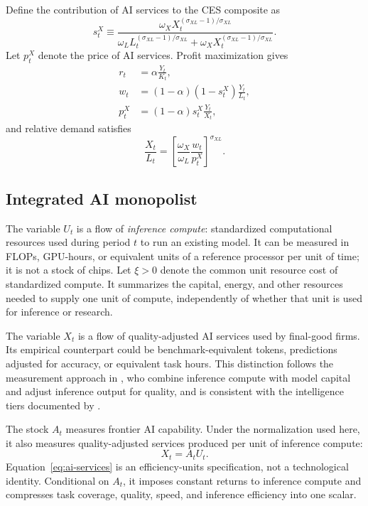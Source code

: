 Define the contribution of AI services to the CES composite as
\begin{equation}
    s^X_t
    \equiv
    \frac{\omega_X X_t^{(\sigma_{XL}-1)/\sigma_{XL}}}
    {\omega_L L_t^{(\sigma_{XL}-1)/\sigma_{XL}}
        +\omega_X X_t^{(\sigma_{XL}-1)/\sigma_{XL}}}.
    \label{eq:ai-composite-share}
\end{equation}
Let $p^X_t$ denote the price of AI services. Profit maximization gives
\begin{align}
    r_t
    &=\alpha\frac{Y_t}{K_t},
    \label{eq:capital-demand}\\
    w_t
    &=(1-\alpha)(1-s^X_t)\frac{Y_t}{L_t},
    \label{eq:labor-demand}\\
    p^X_t
    &=(1-\alpha)s^X_t\frac{Y_t}{X_t},
    \label{eq:ai-demand}
\end{align}
and relative demand satisfies
\begin{equation}
    \frac{X_t}{L_t}
    =
    \left[
        \frac{\omega_X}{\omega_L}
        \frac{w_t}{p^X_t}
    \right]^{\sigma_{XL}}.
    \label{eq:relative-ai-demand}
\end{equation}

\subsection{Integrated AI monopolist}

The variable $U_t$ is a flow of \emph{inference compute}: standardized
computational resources used during period $t$ to run an existing model. It can be
measured in FLOPs, GPU-hours, or equivalent units of a reference processor per unit
of time; it is not a stock of chips. Let $\xi>0$ denote the common unit resource cost
of standardized compute. It summarizes the capital, energy, and other resources
needed to supply one unit of compute, independently of whether that unit is used for
inference or research.

The variable $X_t$ is a flow of quality-adjusted AI services used by final-good
firms. Its empirical counterpart could be benchmark-equivalent tokens, predictions
adjusted for accuracy, or equivalent task hours. This distinction follows the
measurement approach in \citet{korinekmckelvey2026}, who combine inference compute
with model capital and adjust inference output for quality, and is consistent with
the intelligence tiers documented by \citet{demireretal2025}.

The stock $A_t$ measures frontier AI capability. Under the normalization used here,
it also measures quality-adjusted services produced per unit of inference compute:
\begin{equation}
    X_t=A_tU_t.
    \label{eq:ai-services}
\end{equation}
Equation~\eqref{eq:ai-services} is an efficiency-units specification, not a
technological identity. Conditional on $A_t$, it imposes constant returns to
inference compute and compresses task coverage, quality, speed, and inference
efficiency into one scalar.

